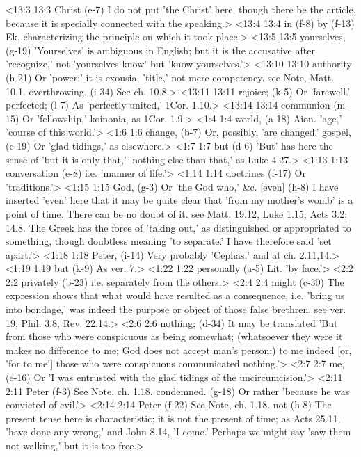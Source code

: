 <13:3 13:3  Christ (e-7)  I do not put 'the Christ' here, though there be the article,  because it is specially connected with the speaking.>
<13:4 13:4  in (f-8)  by (f-13)
  Ek, characterizing the principle on which it took place.>
<13:5 13:5  yourselves, (g-19)  'Yourselves' is ambiguous in English; but it is the  accusative after 'recognize,' not 'yourselves know' but 'know  yourselves.'>
<13:10 13:10  authority (h-21)  Or 'power;' it is exousia, 'title,' not mere competency.  see Note, Matt. 10.1.
  overthrowing. (i-34)  See ch. 10.8.>
<13:11 13:11  rejoice; (k-5)  Or 'farewell.'
  perfected; (l-7)  As 'perfectly united,' 1Cor. 1.10.>
<13:14 13:14  communion (m-15)  Or 'fellowship,' koinonia, as 1Cor. 1.9.>
<1:4 1:4  world, (a-18)  Aion. 'age,' 'course of this world.'>
<1:6 1:6  change, (b-7)  Or, possibly, 'are changed.'
  gospel, (c-19)  Or 'glad tidings,' as elsewhere.>
<1:7 1:7  but (d-6)  'But' has here the sense of 'but it is only that,' 'nothing  else than that,' as Luke 4.27.>
<1:13 1:13  conversation (e-8)  i.e. 'manner of life.'>
<1:14 1:14  doctrines (f-17)  Or 'traditions.'>
<1:15 1:15  God, (g-3)  Or 'the God who,' &c.
  [even] (h-8)  I have inserted 'even' here that it may be quite clear that  'from my mother's womb' is a point of time. There can be no  doubt of it. see Matt. 19.12, Luke 1.15; Acts 3.2; 14.8. The  Greek has the force of 'taking out,' as distinguished or  appropriated to something, though doubtless meaning 'to  separate.' I have therefore said 'set apart.'>
<1:18 1:18  Peter, (i-14)  Very probably 'Cephas;' and at ch. 2.11,14.>
<1:19 1:19  but (k-9)  As ver. 7.>
<1:22 1:22  personally (a-5)  Lit. 'by face.'>
<2:2 2:2  privately (b-23)  i.e. separately from the others.>
<2:4 2:4  might (c-30)  The expression shows that what would have resulted as a  consequence, i.e. 'bring us into bondage,' was indeed the  purpose or object of those false brethren. see ver. 19; Phil.  3.8; Rev. 22.14.>
<2:6 2:6  nothing; (d-34)  It may be translated 'But from those who were conspicuous as  being somewhat; (whatsoever they were it makes no difference to  me; God does not accept man's person;) to me indeed [or, 'for  to me'] those who were conspicuous communicated nothing.'>
<2:7 2:7  me, (e-16)  Or 'I was entrusted with the glad tidings of the  uncircumcision.'>
<2:11 2:11  Peter (f-3)  See Note, ch. 1.18.
  condemned. (g-18)  Or rather 'because he was convicted of evil.'>
<2:14 2:14  Peter (f-22)  See Note, ch. 1.18.
  not (h-8)  The present tense here is characteristic; it is not the  present of time; as Acts 25.11, 'have done any wrong,' and John  8.14, 'I come.' Perhaps we might say 'saw them not walking,'  but it is too free.>
